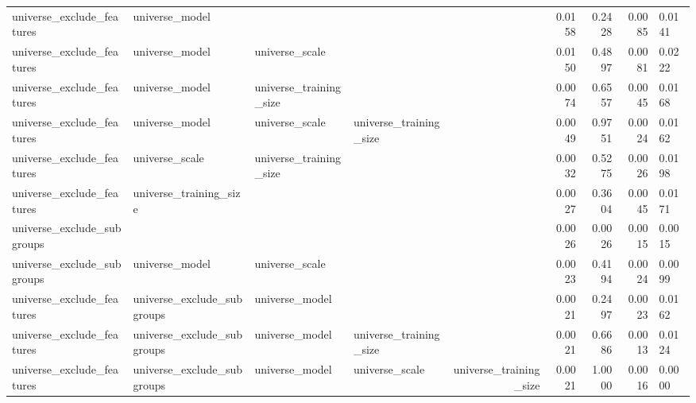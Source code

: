 \begin{table}
\begin{tabular}{llllrrrr}
 universe\_exclude\_features &             universe\_model &                        &                        &                        &                0.0158 &           0.2428 &         0.0085 &    0.0141 \\
 universe\_exclude\_features &             universe\_model &         universe\_scale &                        &                        &                0.0150 &           0.4897 &         0.0081 &    0.0222 \\
 universe\_exclude\_features &             universe\_model & universe\_training\_size &                        &                        &                0.0074 &           0.6557 &         0.0045 &    0.0168 \\
 universe\_exclude\_features &             universe\_model &         universe\_scale & universe\_training\_size &                        &                0.0049 &           0.9751 &         0.0024 &    0.0162 \\
 universe\_exclude\_features &             universe\_scale & universe\_training\_size &                        &                        &                0.0032 &           0.5275 &         0.0026 &    0.0198 \\
 universe\_exclude\_features &     universe\_training\_size &                        &                        &                        &                0.0027 &           0.3604 &         0.0045 &    0.0171 \\
universe\_exclude\_subgroups &                            &                        &                        &                        &                0.0026 &           0.0026 &         0.0015 &    0.0015 \\
universe\_exclude\_subgroups &             universe\_model &         universe\_scale &                        &                        &                0.0023 &           0.4194 &         0.0024 &    0.0099 \\
 universe\_exclude\_features & universe\_exclude\_subgroups &         universe\_model &                        &                        &                0.0021 &           0.2497 &         0.0023 &    0.0162 \\
 universe\_exclude\_features & universe\_exclude\_subgroups &         universe\_model & universe\_training\_size &                        &                0.0021 &           0.6686 &         0.0013 &    0.0124 \\
 universe\_exclude\_features & universe\_exclude\_subgroups &         universe\_model &         universe\_scale & universe\_training\_size &                0.0021 &           1.0000 &         0.0016 &    0.0000 \\

\end{tabular}
\end{table}
